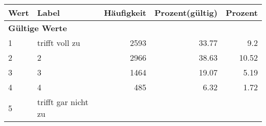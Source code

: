      \begin{longtable}{lXrrr}
     \toprule
     \textbf{Wert} & \textbf{Label} & \textbf{Häufigkeit} & \textbf{Prozent(gültig)} & \textbf{Prozent} \\
     \endhead
     \midrule
     \multicolumn{5}{l}{\textbf{Gültige Werte}}\\

     1 &
     \multicolumn{1}{X}{ trifft voll zu   } &


       \num{2593} &
       \num[round-mode=places,round-precision=2]{33,77} &
         \num[round-mode=places,round-precision=2]{9,2} \\

     2 &
     \multicolumn{1}{X}{ 2   } &


       \num{2966} &
       \num[round-mode=places,round-precision=2]{38,63} &
         \num[round-mode=places,round-precision=2]{10,52} \\

     3 &
     \multicolumn{1}{X}{ 3   } &


       \num{1464} &
       \num[round-mode=places,round-precision=2]{19,07} &
         \num[round-mode=places,round-precision=2]{5,19} \\

     4 &
     \multicolumn{1}{X}{ 4   } &


       \num{485} &
       \num[round-mode=places,round-precision=2]{6,32} &
         \num[round-mode=places,round-precision=2]{1,72} \\

     5 &
     \multicolumn{1}{X}{ trifft gar nicht zu   } &



\end{longtable}
